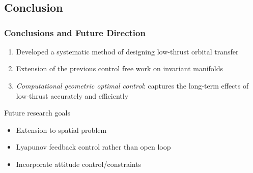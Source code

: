 
\section*{}
\subsection*{Conclusion}
\begin{frame} %
\frametitle{Conclusions and Future Direction}
  \begin{enumerate}
  	\item<+-> Developed a systematic method of designing low-thrust orbital transfer
  	\item<+-> Extension of the previous control free work on invariant manifolds
	\item<+-> \emph{Computational geometric optimal control}: captures the long-term effects of low-thrust accurately and efficiently  	
  \end{enumerate}
  \pause
  Future research goals
  	\begin{itemize} 
	  \item Extension to spatial problem 
	  \item Lyapunov feedback control rather than open loop 
	  \item Incorporate attitude control/constraints 
	\end{itemize}
\end{frame}   %

